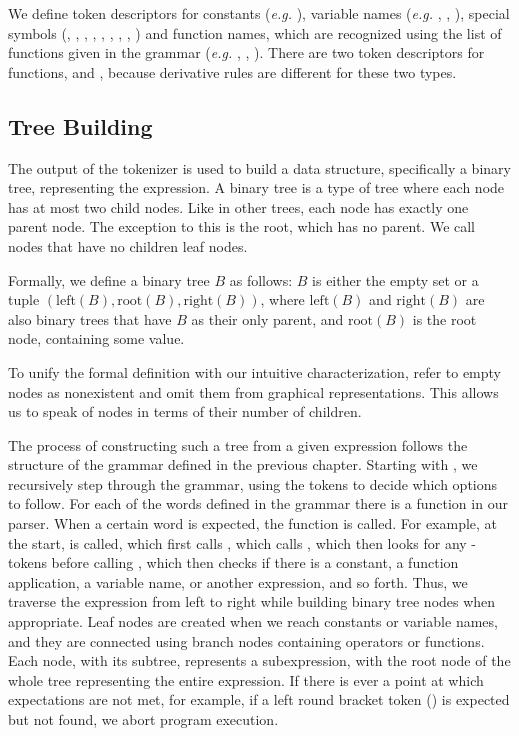 \documentclass[12pt, a4paper]{report} %
\begin{document}
We define token descriptors for constants (\textit{e.g.} ), variable names (\textit{e.g.} , , ), special symbols (, , , , , , , , ) and function names, which are recognized using the list of functions given in the grammar (\textit{e.g.}  , , ).
There are two token descriptors for functions,  and , because derivative rules are different for these two types.

\subsection{Tree Building}
The output of the tokenizer is used to build a data structure, specifically a binary tree, representing the expression.
A binary tree is a type of tree where each node has at most two child nodes.
Like in other trees, each node has exactly one parent node.
The exception to this is the root, which has no parent.
We call nodes that have no children leaf nodes.

Formally, we define a binary tree $B$ as follows:
$B$ is either the empty set or a tuple $(\text{left}(B),\text{root}(B),\text{right}(B))$, where $\text{left}(B)$ and $\text{right}(B)$ are also binary trees that have $B$ as their only parent, and $\text{root}(B)$ is the root node, containing some value.

To unify the formal definition with our intuitive characterization, refer to empty nodes as nonexistent and omit them from graphical representations.
This allows us to speak of nodes in terms of their number of children.

The process  of constructing such a tree from a given expression follows the structure of the grammar defined in the previous chapter.
Starting with , we recursively step through the grammar, using the tokens to decide which options to follow.
For each of the words defined in the grammar there is a function in our parser.
When a certain word is expected, the function is called.
For example, at the start,  is called, which first calls , which calls , which then looks for any -tokens before calling , which then checks if there is a constant, a function application, a variable name, or another expression, and so forth.
Thus, we traverse the expression from left to right while building binary tree nodes when appropriate.
Leaf nodes are created when we reach constants or variable names, and they are connected using branch nodes containing operators or functions.
Each node, with its subtree, represents a subexpression, with the root node of the whole tree representing the entire expression.
If there is ever a point at which expectations are not met, for example, if a left round bracket token () is expected but not found, we abort program execution.
\end{document}
